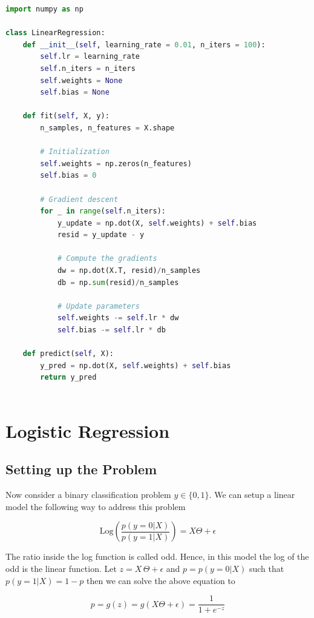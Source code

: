 \documentclass[11pt]{article}
\theoremstyle{definition}
\begin{document}
\begin{lstlisting}[language=Python]
import numpy as np

class LinearRegression:
    def __init__(self, learning_rate = 0.01, n_iters = 100):
        self.lr = learning_rate
        self.n_iters = n_iters
        self.weights = None
        self.bias = None

    def fit(self, X, y):
        n_samples, n_features = X.shape
        
        # Initialization 
        self.weights = np.zeros(n_features)
        self.bias = 0
        
        # Gradient descent 
        for _ in range(self.n_iters):
            y_update = np.dot(X, self.weights) + self.bias
            resid = y_update - y
            
            # Compute the gradients 
            dw = np.dot(X.T, resid)/n_samples 
            db = np.sum(resid)/n_samples 

            # Update parameters 
            self.weights -= self.lr * dw
            self.bias -= self.lr * db

    def predict(self, X):
        y_pred = np.dot(X, self.weights) + self.bias
        return y_pred
    
\end{lstlisting}




\newpage
\section{Logistic Regression}

\subsection{Setting up the Problem}

Now consider a binary classification problem $y \in \{0, 1\}$. We can setup a linear model the following way to address this problem

$$
\text{Log}\left(\frac{p(y=0|X)}{p(y= 1|X)}\right) = X \Theta + \epsilon
$$

The ratio inside the log function is called odd. Hence, in this model the log of the odd is the linear function. Let $z = X \, \Theta + \epsilon$ and $p = p(y=0|X)$ such that $p(y=1|X) = 1 - p$ then we can solve the above equation to  

$$
p = g(z) = g(X \Theta + \epsilon) = \frac{1}{1+e^{-z}}
$$
\end{document}
